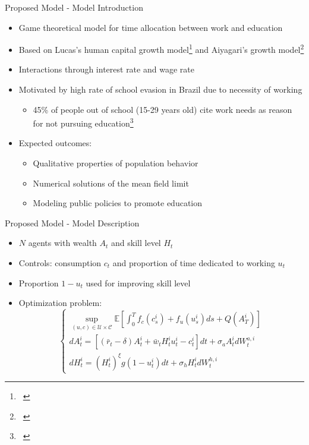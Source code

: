 \documentclass{beamer}
\begin{document}
\begin{frame}{Proposed Model - Model Introduction}
\begin{itemize}
    \item Game theoretical model for time allocation between work and education
    \item Based on Lucas's human capital growth model\footnote{~\cite{lucas1988mechanics}} and Aiyagari's growth model\footnote{ ~\cite{achdou2014partial}}
    \item Interactions through interest rate and wage rate
    \item Motivated by high rate of school evasion in Brazil due to necessity of working
    \begin{itemize}
        \item 45\% of people out of school (15-29 years old) cite work needs as reason for not pursuing education\footnote{~\cite{pnad2023short}}
    \end{itemize}
    \item Expected outcomes:
    \begin{itemize}
        \item Qualitative properties of population behavior
        \item Numerical solutions of the mean field limit
        \item Modeling public policies to promote education
    \end{itemize}
\end{itemize}
\end{frame}

\begin{frame}{Proposed Model - Model Description}
\begin{itemize}
    \item $N$ agents with wealth $A_t$ and skill level $H_t$
    \item Controls: consumption $c_t$ and proportion of time dedicated to working $u_t$
    \item Proportion $1-u_t$ used for improving skill level
    \item Optimization problem:
    \begin{equation}
    \begin{cases}
        \sup\limits_{(u,c) \in \mathcal{U} \times \mathcal{C}}\mathbb{E} [ \int_0^T f_c(c^i_s) + f_u(u^i_s) ds + Q(A^i_T) ]\\
        d A^i_t = \left[ (\bar r_t - \delta) A^i_t + \bar w_t H^i_t u^i_t - c^i_t  \right] dt + \sigma_a A^i_t d W^{a,i}_t\\
        d H^i_t = (H^i_t)^\xi g(1 - u^i_t) dt + \sigma_h H^i_t d W^{h,i}_t
    \end{cases}
    \end{equation}
\end{itemize}
\end{frame}
\end{document}
